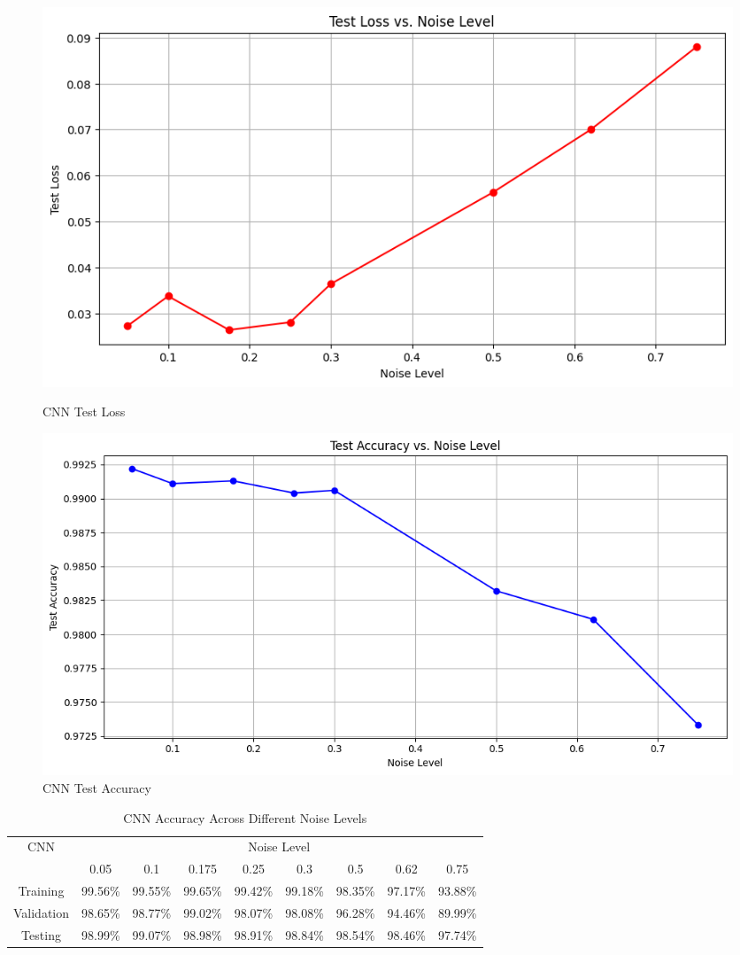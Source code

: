 \begin{figure}[htbp]
  \centering
  \begin{minipage}{0.49\textwidth}
    \includegraphics[width=\linewidth]{figures/cnn_testloss.png}
    \caption{CNN Test Loss}
    \label{fig:cnn_testloss}
  \end{minipage}\hfill
  \begin{minipage}{0.49\textwidth}
    \includegraphics[width=\linewidth]{figures/cnn_testaccuracy.png}
    \caption{CNN Test Accuracy}
    \label{fig:cnn_testaccuracy}
  \end{minipage}
\end{figure}


\begin{table}[h!]
    \centering
    
    \begin{tabular}{|c|c|c|c|c|c|c|c|c|}
        \hline
        \multirow{2}{*}{CNN} & \multicolumn{8}{c|}{Noise Level} \\ \cline{2-9}
                             & 0.05 & 0.1 & 0.175 & 0.25 & 0.3 & 0.5 & 0.62 & 0.75 \\ \hline
        Training              & 99.56\% & 99.55\%  & 99.65\%  & 99.42\%  & 99.18\%  & 98.35\%  & 97.17\%  & 93.88\%  \\ \hline
        Validation            & 98.65\% & 98.77\% & 99.02\%  & 98.07\% & 98.08\% & 96.28\% & 94.46\% & 89.99\% \\ \hline
        Testing               & 98.99\% & 99.07\% & 98.98\%  & 98.91\% & 98.84\% & 98.54\% & 98.46\% & 97.74\% \\ \hline
    \end{tabular}
    \caption{CNN Accuracy Across Different Noise Levels}
\end{table}

